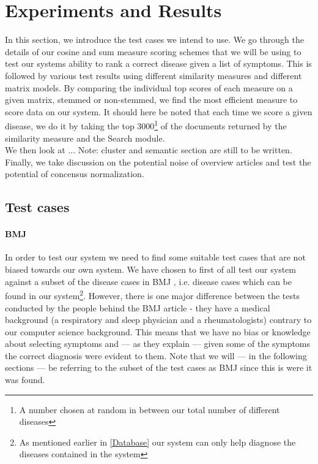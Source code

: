 \chapter{Experiments and Results\label{ExperimentsResults}}

In this section, we introduce the test cases we intend to use. We go
through the details of our cosine and sum measure scoring schemes that
we will be using to test our systems ability to rank a correct disease
given a list of symptoms. This is followed by various test results
using different similarity measures and different matrix models. By
comparing the individual top scores of each measure on a given matrix,
stemmed or non-stemmed, we find the most efficient measure to score
data on our system. It should here be noted that each time we score a
given disease, we do it by taking the top 3000\footnote{A number
  chosen at random in between our total number of different diseases}
of the documents returned by the similarity measure and the Search
module. \\

We then look at  ... Note: cluster and
semantic section are still to be written. \\

Finally, we take discussion on the potential noise of overview
articles and test the potential of concensus normalization.

\section{Test cases}

\subsubsection{BMJ}
In order to test our system we need to find some suitable test cases
that are not biased towards our own system. We have chosen to first of
all test our system against a subset of the disease cases in BMJ
\cite{HangwiTang11102006}, i.e. disease cases which can be found in
our system\footnote{As mentioned earlier in \ref{Database} our system
  can only help diagnose the diseases contained in the
  system}. However, there is one major difference between the tests
conducted by the people behind the BMJ article - they have a medical
background (a respiratory and sleep physician and a rheumatologists)
contrary to our computer science background. This means that we have
no bias or knowledge about selecting symptoms and --- as they explain ---
given some of the symptoms the correct diagnosis were evident to
them. Note that we will --- in the following sections --- be referring to
the subset of the test cases as BMJ since this is were it was
found. \\

